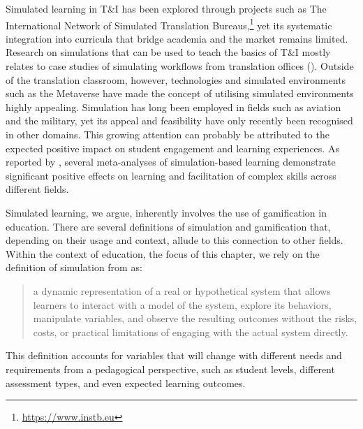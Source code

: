 \documentclass[output=paper]{langscibook}
\begin{document}
Simulated learning in T\&I has been explored through projects such as The International Network of Simulated Translation Bureaus,\footnote{\url{https://www.instb.eu}} yet its systematic integration into curricula that bridge academia and the market remains limited. Research on simulations that can be used to teach the basics of T\&I mostly relates to case studies of simulating workflows from translation offices (\citealt{konttinen2020translation}). Outside of the translation classroom, however, technologies and simulated environments such as the Metaverse have made the concept of utilising simulated environments highly appealing. Simulation has long been employed in fields such as aviation and the military, yet its appeal and feasibility have only recently been recognised in other domains.  This growing attention can probably be attributed to the expected positive impact on student engagement and learning experiences. As reported by \citet[1]{nyström2024simulators}, several meta-analyses of simulation-based learning demonstrate significant positive effects on learning and facilitation of complex skills across different fields.

Simulated learning, we argue, inherently involves the use of gamification in education. There are several definitions of simulation and gamification that, depending on their usage and context, allude to this connection to other fields. Within the context of education, the focus of this chapter, we rely on the definition of simulation from \citet[246]{alessi2000multimedia} as: 
\begin{quote}a dynamic representation of a real or hypothetical system that allows learners to interact with a model of the system, explore its behaviors, manipulate variables, and observe the resulting outcomes without the risks, costs, or practical limitations of engaging with the actual system directly.\end{quote} This definition accounts for variables that will change with different needs and requirements from a pedagogical perspective, such as student levels, different assessment types, and even expected learning outcomes. 
\end{document}
